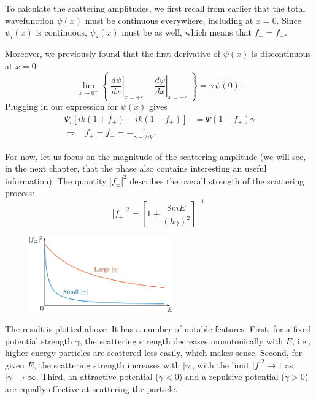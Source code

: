 \documentclass[pra,12pt]{revtex4}
\begin{document}
To calculate the scattering amplitudes, we first recall from earlier
that the total wavefunction $\psi(x)$ must be continuous everywhere,
including at $x = 0$.  Since $\psi_i(x)$ is continuous, $\psi_s(x)$
must be as well, which means that $f_- = f_+$.

Moreover, we previously found that the first derivative of $\psi(x)$
is discontinuous at $x=0$:
\begin{equation}
  \lim_{\varepsilon\rightarrow 0^+} \left\{\; \left.\frac{d\psi}{dx}\right|_{x = +\varepsilon} - \left.\frac{d\psi}{dx}\right|_{x = -\varepsilon}\; \right\}  =  \gamma\, \psi(0).
\end{equation}
Plugging in our expression for $\psi(x)$ gives
\begin{equation}
  \begin{aligned}\Psi_i\left[ik(1+f_\pm) - ik(1-f_\pm)\right]  &=  \Psi(1+f_\pm) \gamma \\ \Rightarrow \;\;\; f_+ = f_- = -\frac{\gamma}{\gamma - 2ik}.\end{aligned}
\end{equation}

For now, let us focus on the magnitude of the scattering amplitude (we
will see, in the next chapter, that the phase also contains
interesting an useful information).  The quantity $|f_\pm|^2$
describes the overall strength of the scattering process:
\begin{equation}
  |f_\pm|^2 = \left[1 + \frac{8mE}{(\hbar\gamma)^2}\right]^{-1}.
\end{equation}

\begin{figure}[h]
  \centering\includegraphics[width=0.55\textwidth]{scattering1df}
\end{figure}

The result is plotted above.  It has a number of notable features.
First, for a fixed potential strength $\gamma$, the scattering
strength decreases monotonically with $E$; i.e., higher-energy
particles are scattered less easily, which makes sense.  Second, for
given $E$, the scattering strength increases with $|\gamma|$, with the
limit $|f|^2 \rightarrow 1$ as $|\gamma|\rightarrow \infty$.  Third,
an attractive potential ($\gamma < 0$) and a repulsive potential
($\gamma > 0$) are equally effective at scattering the particle.
\end{document}
